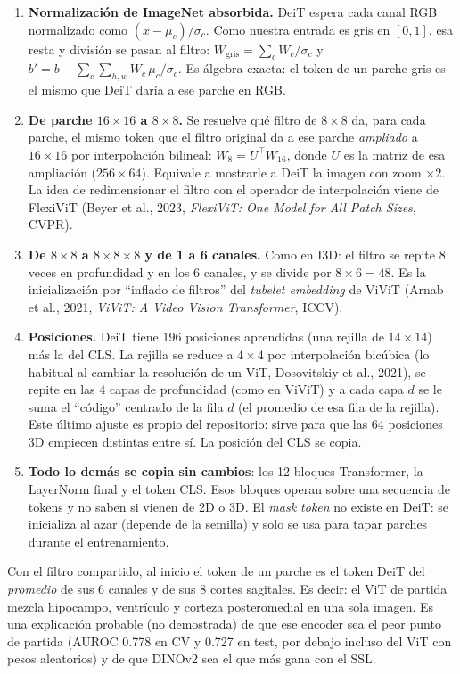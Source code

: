 \documentclass[11pt,a4paper]{article}
\begin{document}
\begin{enumerate}
\item \textbf{Normalización de ImageNet absorbida.} DeiT espera cada canal RGB normalizado como
  $(x-\mu_c)/\sigma_c$. Como nuestra entrada es gris en $[0,1]$, esa resta y división se pasan al
  filtro: $W_\text{gris} = \sum_c W_c/\sigma_c$ y $b' = b - \sum_c \sum_{h,w} W_c\,\mu_c/\sigma_c$.
  Es álgebra exacta: el token de un parche gris es el mismo que DeiT daría a ese parche en RGB.
\item \textbf{De parche $16\times16$ a $8\times8$.} Se resuelve qué filtro de $8\times8$ da, para
  cada parche, el mismo token que el filtro original da a ese parche \emph{ampliado} a $16\times16$
  por interpolación bilineal: $W_8 = U^{\top} W_{16}$, donde $U$ es la matriz de esa ampliación
  ($256\times64$). Equivale a mostrarle a DeiT la imagen con zoom $\times2$. La idea de
  redimensionar el filtro con el operador de interpolación viene de FlexiViT (Beyer et al., 2023,
  \emph{FlexiViT: One Model for All Patch Sizes}, CVPR).
\item \textbf{De $8\times8$ a $8\times8\times8$ y de 1 a 6 canales.} Como en I3D: el filtro se repite
  8 veces en profundidad y en los 6 canales, y se divide por $8\times6=48$. Es la inicialización por
  ``inflado de filtros'' del \emph{tubelet embedding} de ViViT (Arnab et al., 2021, \emph{ViViT: A
  Video Vision Transformer}, ICCV).
\item \textbf{Posiciones.} DeiT tiene 196 posiciones aprendidas (una rejilla de $14\times14$) más la
  del CLS. La rejilla se reduce a $4\times4$ por interpolación bicúbica (lo habitual al cambiar la
  resolución de un ViT, Dosovitskiy et al., 2021), se repite en las 4 capas de profundidad (como en
  ViViT) y a cada capa $d$ se le suma el ``código'' centrado de la fila $d$ (el promedio de esa fila
  de la rejilla). Este último ajuste es propio del repositorio: sirve para que las 64 posiciones 3D
  empiecen distintas entre sí. La posición del CLS se copia.
\item \textbf{Todo lo demás se copia sin cambios}: los 12 bloques Transformer, la LayerNorm final y
  el token CLS. Esos bloques operan sobre una secuencia de tokens y no saben si vienen de 2D o 3D. El
  \emph{mask token} no existe en DeiT: se inicializa al azar (depende de la semilla) y solo se usa
  para tapar parches durante el entrenamiento.
\end{enumerate}

\begin{warnbox}
Con el filtro compartido, al inicio el token de un parche es el token DeiT del \emph{promedio} de sus
6 canales y de sus 8 cortes sagitales. Es decir: el ViT de partida mezcla hipocampo, ventrículo y
corteza posteromedial en una sola imagen. Es una explicación probable (no demostrada) de que ese
encoder sea el peor punto de partida (AUROC 0.778 en CV y 0.727 en test, por debajo incluso del ViT
con pesos aleatorios) y de que DINOv2 sea el que más gana con el SSL.
\end{warnbox}
\end{document}
